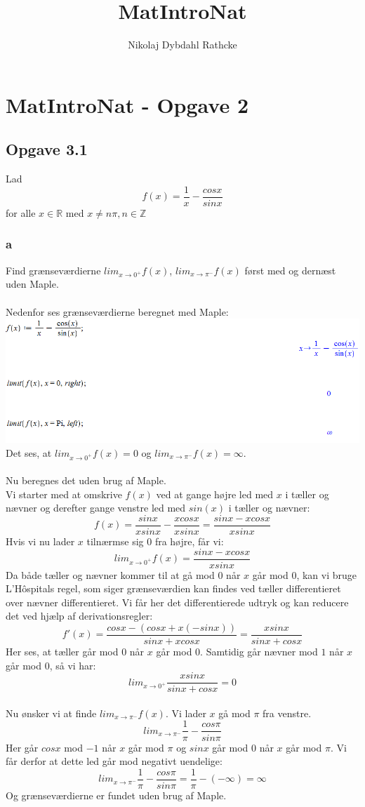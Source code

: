 \documentclass[12pt]{article}
\title{MatIntroNat}
\author{Nikolaj Dybdahl Rathcke}
\begin{document}
\section*{MatIntroNat - Opgave 2}

\subsection*{Opgave 3.1}
Lad
$$f(x)=\frac{1}{x}-\frac{cosx}{sinx}$$
for alle $x\in \mathbb{R}$ med $x\neq n\pi,n\in \mathbb{Z}$

\subsubsection*{a}
Find grænseværdierne $lim_{x\rightarrow0^{+}} f(x)$, $lim_{x\rightarrow\pi^{-}} f(x)$ først med og dernæst uden Maple.\\
\\
Nedenfor ses grænseværdierne beregnet med Maple:\\
\includegraphics[scale=0.6]{Pic1}\\
Det ses, at $lim_{x\rightarrow0^{+}} f(x)=0$ og $lim_{x\rightarrow\pi^{-}} f(x)=\infty$.\\
\\
Nu beregnes det uden brug af Maple.\\
Vi starter med at omskrive $f(x)$ ved at gange højre led med $x$ i tæller og nævner og derefter gange venstre led med $sin(x)$ i tæller og nævner:
$$f(x)=\frac{sinx}{xsinx}-\frac{xcosx}{xsinx}=\frac{sinx-xcosx}{xsinx}$$
Hvis vi nu lader $x$ tilnærmse sig $0$ fra højre, får vi:\\
$$lim_{x\rightarrow0^{+}} f(x)=\frac{sinx-xcosx}{xsinx}$$
Da både tæller og nævner kommer til at gå mod 0 når $x$ går mod 0, kan vi bruge L'Hôspitals regel, som siger grænseværdien kan findes ved tæller differentieret over nævner differentieret. Vi får her det differentierede udtryk og kan reducere det ved hjælp af derivationsregler:
$$f'(x)=\frac{cosx-(cosx+x(-sinx))}{sinx+xcosx}=\frac{xsinx}{sinx+cosx}$$
Her ses, at tæller går mod $0$ når $x$ går mod $0$. Samtidig går nævner mod $1$ når $x$ går mod $0$, så vi har:
$$lim_{x\rightarrow0^{+}}\frac{xsinx}{sinx+cosx}=0$$
\\
Nu ønsker vi at finde $lim_{x\rightarrow\pi^{-}} f(x)$. Vi lader $x$ gå mod $\pi$ fra venstre.\\
$$lim_{x\rightarrow\pi^{-}} \frac{1}{\pi}-\frac{cos\pi}{sin\pi}$$
Her går $cosx$ mod $-1$ når $x$ går mod $\pi$ og $sinx$ går mod $0$ når $x$ går mod $\pi$. Vi får derfor at dette led går mod negativt uendelige:
$$lim_{x\rightarrow\pi^{-}} \frac{1}{\pi}-\frac{cos\pi}{sin\pi}=\frac{1}{\pi}-(-\infty)=\infty$$
Og grænseværdierne er fundet uden brug af Maple.
\end{document}
